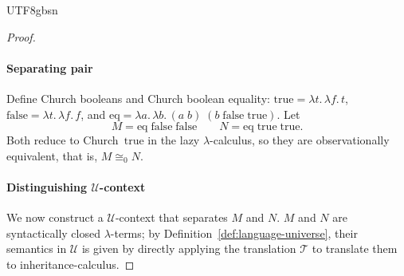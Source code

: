\begin{CJK*}{UTF8}{gbsn}
\begin{proof}
  \paragraph{Separating pair}
  Define Church booleans and Church boolean equality:
  $\mathrm{true} = \lambda t.\,\lambda f.\, t$,
  $\mathrm{false} = \lambda t.\,\lambda f.\, f$, and
  $\mathrm{eq} = \lambda a.\,\lambda b.\,
  (a\;b)\;(b\;\mathrm{false}\;\mathrm{true})$.
  Let
  \[
    M = \mathrm{eq}\;\mathrm{false}\;\mathrm{false}
    \qquad
    N = \mathrm{eq}\;\mathrm{true}\;\mathrm{true}.
  \]
  Both reduce to Church~$\mathrm{true}$ in the
  lazy $\lambda$-calculus, so they are observationally
  equivalent, that is, $M \cong_0 N$.

  \paragraph{Distinguishing $\mathscr{U}$-context}
  We now construct a $\mathscr{U}$-context that
  separates $M$ and $N$.
  $M$ and $N$ are syntactically closed $\lambda$-terms;
  by Definition~\ref{def:language-universe}, their
  semantics in $\mathscr{U}$ is given by directly applying
  the translation $\mathcal{T}$ to translate them to inheritance-calculus.
  \fi


\end{proof}
\end{CJK*}
